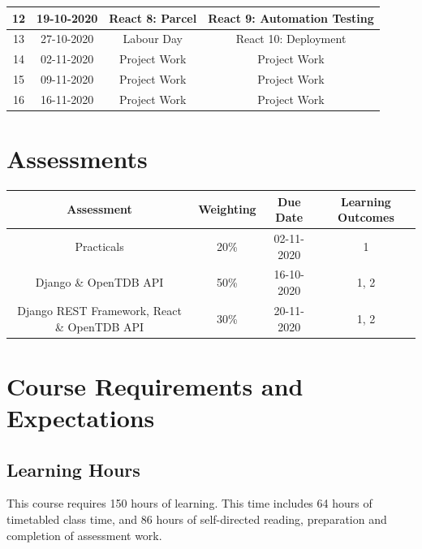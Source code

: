 \documentclass{article}
\begin{document}
\begin{tabular}{|c|c|c|c|}
	\small 12     & \small 19-10-2020 & \small React 8: Parcel                                 & \small React 9: Automation Testing                          \\ \hline
	\small 13     & \small 27-10-2020 & \cellcolor{yellow} \small Labour Day                   & \small React 10: Deployment                                          \\ \hline
	\small 14     & \small 02-11-2020 & \small Project Work                                    & \small Project Work                                         \\ \hline
	\small 15     & \small 09-11-2020 & \small Project Work                                    & \small Project Work                                         \\ \hline
	\small 16     & \small 16-11-2020 & \small Project Work                                    & \small Project Work                                         \\ \hline
\end{tabular}

\section*{Assessments}
\renewcommand{\arraystretch}{1.5}
\begin{tabular}{|c|c|c|c|}
	\hline
	\textbf{Assessment}                                & \textbf{Weighting} & \textbf{Due Date} & \textbf{Learning Outcomes} \\ \hline 
	\small Practicals                                  & \small 20\%        & \small 02-11-2020 & \small 1                   \\ \hline
	\small Django \& OpenTDB API                       & \small 50\%        & \small 16-10-2020 & \small 1, 2                \\ \hline
	\small Django REST Framework, React \& OpenTDB API & \small 30\%        & \small 20-11-2020 & \small 1, 2                \\ \hline
\end{tabular}

\section*{Course Requirements and Expectations}

\subsection*{Learning Hours}
This course requires 150 hours of learning. This time includes 64 hours of timetabled class time, and 86 hours of self-directed reading, preparation and completion of assessment work.
\end{document}
